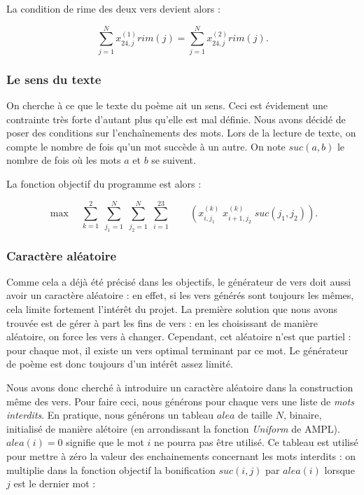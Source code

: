 \documentclass[a4paper,11pt]{article}
\begin{document}
La condition de rime des deux vers devient alors :

\[ \sum_{j=1}^{N} x_{24,j}^{(1)}  rim(j) = \sum_{j=1}^{N} x_{24,j}^{(2)}  rim(j). \]

\subsubsection{Le sens du texte}

On cherche à ce que le texte du poème ait un sens. Ceci est évidement une contrainte très forte d'autant plus qu'elle est mal définie. Nous avons décidé de poser des conditions sur l'enchaînements des mots. Lors de la lecture de texte, on compte le nombre de fois qu'un mot succède à un autre. On note $suc(a,b)$ le nombre de fois où les mots $a$ et $b$ se suivent.

La fonction objectif du programme est alors :

\[ \max \quad  \sum_{k=1}^{2} \; \sum_{j_1=1}^{N} \; \sum_{j_2=1}^{N} \; \sum_{i=1}^{23}\qquad \left( x_{i,j_1}^{(k)} \; x_{i+1,j_2}^{(k)} \; suc(j_1, j_2)\right) . \]

\subsubsection{Caractère aléatoire}

Comme cela a déjà été précisé dans les objectifs, le générateur de vers doit aussi avoir un caractère aléatoire : en effet, si les vers générés sont toujours les mêmes, cela limite fortement l'intérêt du projet. La première solution que nous avons trouvée est de gérer à part les fins de vers : en les choisissant de manière aléatoire, on force les vers à changer. Cependant, cet aléatoire n'est que partiel : 
pour chaque mot, il existe un vers optimal terminant par ce mot. Le générateur de poème est donc toujours d'un intérêt assez limité. 

Nous avons donc cherché à introduire un caractère aléatoire dans la construction même des vers. Pour faire ceci, nous générons pour chaque vers une liste de \textit{mots interdits}. En pratique, nous générons un tableau $alea$ de taille $N$, binaire, initialisé de manière alétoire (en arrondissant la fonction \textit{Uniform} de AMPL). $alea(i)= 0$ signifie que le mot $i$ ne pourra pas être utilisé. Ce tableau est utilisé pour mettre à zéro la valeur des enchainements concernant les mots interdits : on multiplie dans la fonction objectif la bonification $suc(i, j)$ par $alea(i)$ lorsque $j$ est le dernier mot :
\end{document}
